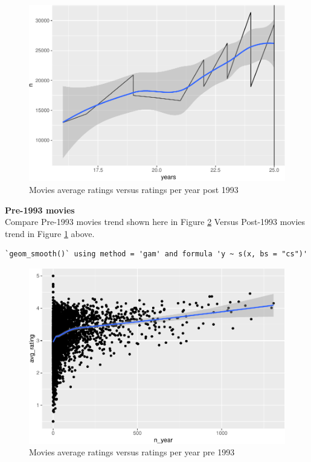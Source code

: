 \documentclass[
]{article}
\begin{document}
\begin{figure}
\centering
\includegraphics{figures/md_3-1.pdf}
\caption{Movies average ratings versus ratings per year post
1993\label{fig:movies_average_ratings_versus_ratings_per_year_post_1993}}
\end{figure}

\newpage

\textbf{Pre-1993 movies}\\
Compare Pre-1993 movies trend shown here in Figure
\ref{fig:movies_average_ratings_versus_ratings_per_year_pre_1993} Versus
Post-1993 movies trend in Figure
\ref{fig:movies_average_ratings_versus_ratings_per_year_post_1993}
above.

\begin{verbatim}
`geom_smooth()` using method = 'gam' and formula 'y ~ s(x, bs = "cs")'
\end{verbatim}

\begin{figure}
\centering
\includegraphics{figures/md_4-1.pdf}
\caption{Movies average ratings versus ratings per year pre
1993\label{fig:movies_average_ratings_versus_ratings_per_year_pre_1993}}
\end{figure}
\end{document}
